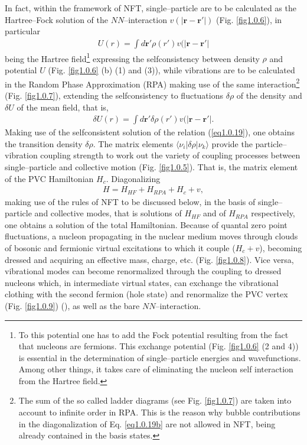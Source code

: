 \documentclass[a4paper,11pt]{book}
\numberwithin{equation}{section}
\numberwithin{figure}{section}
\numberwithin{table}{section}
\newcommand{\braket}[1]{\langle {#1} \rangle }
\begin{document}
  
In fact, within the framework of NFT, single--particle are to be calculated as the Hartree--Fock solution of the $NN$--interaction $v(|\mathbf r-\mathbf r'|)$ (Fig. \ref{fig1.0.6}), in particular
\begin{align}\label{eq1.0.18}
U(r)=\int d\mathbf r' \rho(r')v(|\mathbf r-\mathbf r'|
\end{align}
being the Hartree field\footnote{To this potential one has to add the Fock potential resulting from the fact that nucleons are fermions. This exchange potential (Fig. \ref{fig1.0.6} (2 and 4)) is essential in the determination of single--particle energies and wavefunctions. Among other things, it takes care of eliminating the nucleon self interaction from the Hartree field.} expressing the selfconsistency between density $\rho$ and potential $U$ (Fig. \ref{fig1.0.6} (b) (1) and (3)), while vibrations are to be calculated in the Random Phase Approximation (RPA) making use of the same interaction\footnote{The sum of the so called ladder diagrams (see Fig. \ref{fig1.0.7}) are taken into account to infinite order in RPA. This is the reason why bubble contributions in the diagonalization of Eq. \ref{eq1.0.19b} are not allowed in NFT, being already contained in the basis states.} (Fig. \ref{fig1.0.7}), extending the selfconsistency to fluctuations $\delta\rho$ of the density and $\delta U$ of the mean field, that is,
\begin{align}\label{eq1.0.19}
\delta U(r)=\int d\mathbf r' \delta \rho(r')v(|\mathbf r-\mathbf r'|.
\end{align}
Making use of the selfconsistent solution of the relation (\ref{eq1.0.19}), one obtains the transition density $\delta\rho$. The matrix elements $\braket{\nu_i|\delta\rho|\nu_k}$ provide the  particle--vibration coupling strength to work out the variety of coupling processes between single--particle and collective motion (Fig. \ref{fig1.0.5}). That is, the matrix element of the PVC Hamiltonian $H_c$. Diagonalizing 
\begin{align}\label{eq1.0.19b}
H=H_{HF}+H_{RPA}+H_c+v,
\end{align}
making use of the rules of NFT to be discussed below, in the basis of single--particle and collective modes, that is solutions of $H_{HF}$ and of $H_{RPA}$ respectively, one obtains a solution of the total Hamiltonian. 
Because of quantal zero point fluctuations, a nucleon propagating in the nuclear medium moves through clouds of bosonic and fermionic virtual excitations to which it couple ($H_c+v$), becoming dressed and acquiring an effective mass, charge, etc. (Fig. \ref{fig1.0.8}). Vice versa, vibrational modes can become renormalized through the coupling to dressed nucleons which, in intermediate virtual states, can exchange the vibrational clothing with the second fermion (hole state) and renormalize the PVC vertex (Fig. \ref{fig1.0.9}) (\cite{Barranco:04}), as well as the bare $NN$--interaction. 
\end{document}
